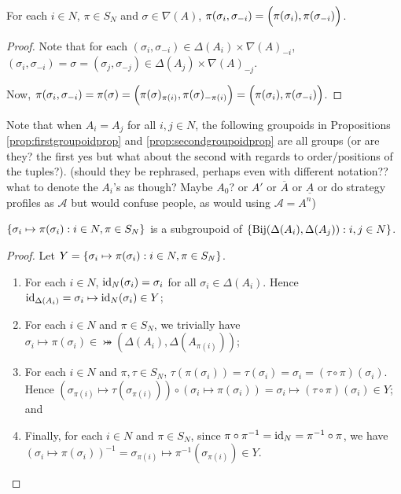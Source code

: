 \begin{proposition}
	For each $i \in N$, $\pi \in S_N$ and $\sigma \in \nabla(A)$, $\pi(\sigma_i, \sigma_{-i}) = \Bigl(\pi(\sigma_i), \pi(\sigma_{-i})\Bigr)$.
	
	\begin{proof}
		Note that for each $(\sigma_i, \sigma_{-i}) \in \Delta(A_i)\times{\nabla(A)}_{-i}$, $(\sigma_i, \sigma_{-i}) = \sigma = (\sigma_j, \sigma_{-j}) \in \Delta(A_j)\times{\nabla(A)}_{-j}$.
		
		Now, $\pi(\sigma_i, \sigma_{-i}) = \pi(\sigma) = \Bigl(\pi(\sigma)_{\pi(i)}, \pi(\sigma)_{-\pi(i)}\Bigr) = \Bigl(\pi(\sigma_i), \pi(\sigma_{-i})\Bigr)$.
	\end{proof}
\end{proposition}

Note that when $A_i = A_j$ for all $i, j \in N$, the following groupoids in Propositions \ref{prop:firstgroupoidprop} and \ref{prop:secondgroupoidprop} are all groups (or are they? the first yes but what about the second with regards to order/positions of the tuples?). (should they be rephrased, perhaps even with different notation?? what to denote the $A_i$'s as though? Maybe $A_0$? or $A'$ or $\overline{A}$ or $\underline{A}$ or do strategy profiles as $\mathcal{A}$ but would confuse people, as would using $\mathcal{A} = A^n$)

\begin{proposition} \label{prop:firstgroupoidprop}
	$\left\{\sigma_i \mapsto \pi(\sigma_i): i \in N, \pi \in S_N\right\}$ is a subgroupoid of $\left\{\operatorname*{Bij}(\Delta(A_i), \Delta(A_j)): i, j \in N\right\}$.
	
	\begin{proof}		
		Let $Y = \left\{\sigma_i \mapsto \pi(\sigma_i): i \in N, \pi \in S_N\right\}$.
		
		\begin{enumerate}
			\item For each $i \in N$, $\text{id}_N(\sigma_i) = \sigma_i$ for all $\sigma_i \in \Delta(A_i)$. Hence $\text{id}_{\Delta(A_i)} = \sigma_i \mapsto \text{id}_N(\sigma_i) \in Y$;
			\item For each $i \in N$ and $\pi \in S_N$, we trivially have $\sigma_i \mapsto \pi(\sigma_i) \in \bij(\Delta(A_i), \Delta(A_{\pi(i)}))$;
			\item For each $i \in N$ and $\pi, \tau \in S_N$, $\tau(\pi(\sigma_i)) = \tau(\sigma_i) = \sigma_i = (\tau \circ \pi)(\sigma_i)$. Hence $(\sigma_{\pi(i)} \mapsto \tau(\sigma_{\pi(i)})) \circ (\sigma_i \mapsto \pi(\sigma_i)) = \sigma_i \mapsto (\tau \circ \pi)(\sigma_i) \in Y$; and
			\item Finally, for each $i \in N$ and $\pi \in S_N$, since $\pi \circ \pi^{-1} = \text{id}_N = \pi^{-1} \circ \pi$, we have $(\sigma_i \mapsto \pi(\sigma_i))^{-1} = \sigma_{\pi(i)} \mapsto \pi^{-1}(\sigma_{\pi(i)}) \in Y$.
		\end{enumerate} \vspace{-0.8cm}
	\end{proof}
\end{proposition}

